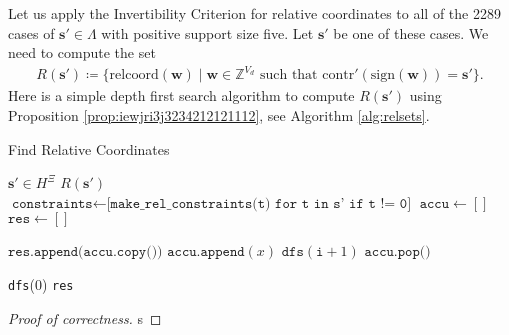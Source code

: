 Let us apply the Invertibility Criterion for relative coordinates to all of the 2289 cases of \( \mathbf{s}' \in \Lambda \) with positive support size five. Let \( \mathbf{s}' \) be one of these cases. We need to compute the set 
\begin{align*}
    R(\mathbf{s}') \coloneqq \{ \mathrm{relcoord}(\mathbf{w}) \mid  \mathbf{w} \in \mathbb Z^{V_d} \text{ such that } \mathrm{contr}'(\mathrm{sign}(\mathbf{w})) = \mathbf{s}' \}.
\end{align*}
Here is a simple depth first search algorithm to compute \( R(\mathbf{s}') \) using Proposition \ref{prop:iewjri3j3234212121112}, see Algorithm \ref{alg:relsets}.

\begin{algorithm}[H]
\caption{Find Relative Coordinates}
\label{alg:relsets}
\begin{algorithmic}[1]
\Require $\mathbf{s}' \in H^{\Xi}$
\Ensure $R(\mathbf{s}')$
    \State $\texttt{constraints} \gets \texttt{[make\_rel\_constraints(t) for t in s' if t != 0]}$
    \State $\texttt{accu} \gets []$ 
    \State $\texttt{res} \gets []$ 
    
            \State $\texttt{res.append(accu.copy())}$
            \State \Return
        \EndIf
            \State $\texttt{accu.append}(x)$
            \State $\texttt{dfs}(\texttt{i} + 1)$
            \State $\texttt{accu.pop()}$
        \EndFor
    \EndFunction

    \State \texttt{dfs}(0)
    \State \Return \texttt{res}
\EndFunction
\end{algorithmic}
\end{algorithm}

\begin{proof}[Proof of correctness]
    s
\end{proof}